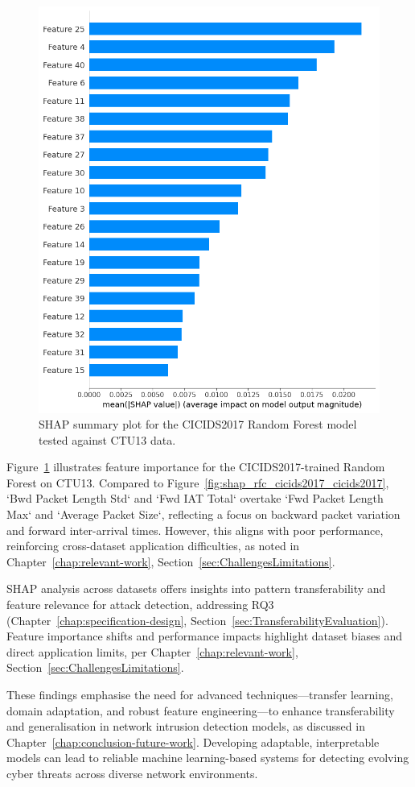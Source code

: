 \begin{figure}[H]
\centering
\includegraphics[width=\textwidth]{img/SHAP_RFCICIDS2017_CTU13.png}
\caption{SHAP summary plot for the CICIDS2017 Random Forest model tested against CTU13 data.}\label{fig:shap_rfc_cicids2017_ctu13}
\end{figure}

Figure~\ref{fig:shap_rfc_cicids2017_ctu13} illustrates feature importance for the CICIDS2017-trained Random Forest on CTU13. Compared to Figure~\ref{fig:shap_rfc_cicids2017_cicids2017}, `Bwd Packet Length Std` and `Fwd IAT Total` overtake `Fwd Packet Length Max` and `Average Packet Size`, reflecting a focus on backward packet variation and forward inter-arrival times. However, this aligns with poor performance, reinforcing cross-dataset application difficulties, as noted in Chapter~\ref{chap:relevant-work}, Section~\ref{sec:ChallengesLimitations}.

SHAP analysis across datasets offers insights into pattern transferability and feature relevance for attack detection, addressing RQ3 (Chapter~\ref{chap:specification-design}, Section~\ref{sec:TransferabilityEvaluation}). Feature importance shifts and performance impacts highlight dataset biases and direct application limits, per Chapter~\ref{chap:relevant-work}, Section~\ref{sec:ChallengesLimitations}.

These findings emphasise the need for advanced techniques—transfer learning, domain adaptation, and robust feature engineering—to enhance transferability and generalisation in network intrusion detection models, as discussed in Chapter~\ref{chap:conclusion-future-work}. Developing adaptable, interpretable models can lead to reliable machine learning-based systems for detecting evolving cyber threats across diverse network environments.